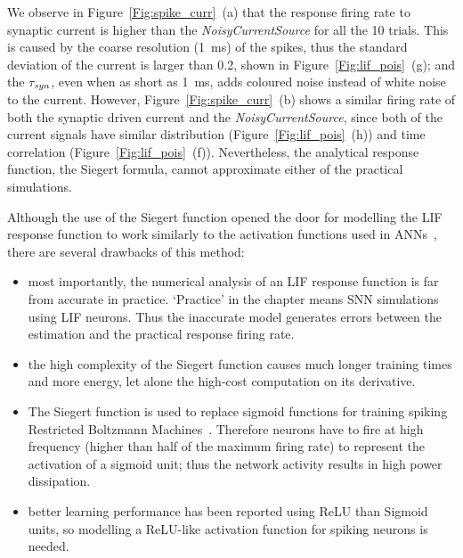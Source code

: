 	We observe in Figure~\ref{Fig:spike_curr}~(a) that the response firing rate to synaptic current is higher than the \textit{NoisyCurrentSource} for all the 10 trials.
	This is caused by the coarse resolution (1~ms) of the spikes, thus the standard deviation of the current is larger than 0.2, shown in Figure~\ref{Fig:lif_pois}~(g);
	and the $\tau_{\textit{\textrm{syn}}}$, even when as short as 1~ms, adds coloured noise instead of white noise to the current.
	However, Figure~\ref{Fig:spike_curr}~(b) shows a similar firing rate of both the synaptic driven current and the \textit{NoisyCurrentSource}, since both of the current signals have similar distribution (Figure~\ref{Fig:lif_pois}~(h)) and time correlation (Figure~\ref{Fig:lif_pois}~(f)).
	Nevertheless, the analytical response function, the Siegert formula, cannot approximate either of the practical simulations.
	
		Although the use of the Siegert function opened the door for modelling the LIF response function to work similarly to the activation functions used in ANNs~\citep{Jug_etal_2012}, there are several drawbacks of this method:
	\begin{itemize}
		\item most importantly, the numerical analysis of an LIF response function is far from accurate in practice. `Practice' in the chapter means SNN simulations using LIF neurons.
		Thus the inaccurate model generates errors between the estimation and the practical response firing rate.
		
		
		\item the high complexity of the Siegert function causes much longer training times and more energy, let alone the high-cost computation on its derivative.
		\item The Siegert function is used to replace sigmoid functions for training spiking Restricted Boltzmann Machines~\citep{Jug_etal_2012}.
		Therefore neurons have to fire at high frequency (higher than half of the maximum firing rate) to represent the activation of a sigmoid unit; thus the network activity results in high power dissipation.
		\item better learning performance has been reported using ReLU than Sigmoid units, so modelling a ReLU-like activation function for spiking neurons is needed.  
	\end{itemize}
	
